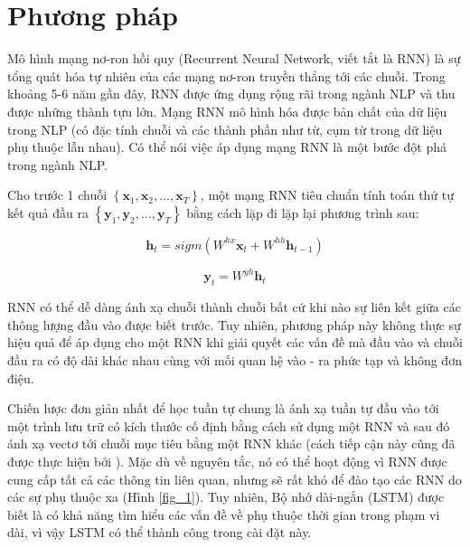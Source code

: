\section{Phương pháp}

Mô hình mạng nơ-ron hồi quy (Recurrent Neural Network, viết tắt là RNN) \citep{werbos1990backpropagation, rumelhart1986learning} là sự tổng quát hóa tự nhiên của các mạng nơ-ron truyền thẳng tới các chuỗi. Trong khoảng 5-6 năm gần đây, RNN được ứng dụng rộng rãi trong ngành NLP và thu được những thành tựu lớn. Mạng RNN mô hình hóa được bản chất của dữ liệu trong NLP (có đặc tính chuỗi và các thành phần như từ, cụm từ trong dữ liệu phụ thuộc lẫn nhau). Có thể nói việc áp dụng mạng RNN là một bước đột phá trong ngành NLP.

Cho trước 1 chuỗi $\left\{\mathbf{x}_{1}, \mathbf{x}_{2}, \ldots, \mathbf{x}_{T}\right\}$, một mạng RNN tiêu chuẩn tính toán thứ tự kết quả đầu ra $\left\{\mathbf{y}_{1}, \mathbf{y}_{2}, \ldots, \mathbf{y}_{T}\right\}$ bằng cách lặp đi lặp lại phương trình sau:

\begin{equation}
\mathbf{h}_{t}=sigm\left(W^{hx}{\mathbf{x}_{t}} + W^{hh}{\mathbf{h}_{t-1}}\right)
\end{equation}

\begin{equation}
\mathbf{y}_{t}=W^{yh}{\mathbf{h}_{t}}
\end{equation}

RNN có thể dễ dàng ánh xạ chuỗi thành chuỗi bất cứ khi nào sự liên kết giữa các thông lượng đầu vào được biết trước. Tuy nhiên, phương pháp này không thực sự hiệu quả để áp dụng cho một RNN khi giải quyết các vấn đề mà đầu vào và chuỗi đầu ra có độ dài khác nhau cùng với mối quan hệ vào - ra phức tạp và không đơn điệu.

Chiến lược đơn giản nhất để học tuần tự chung là ánh xạ tuần tự đầu vào tới một trình lưu trữ có kích thước cố định bằng cách sử dụng một RNN và sau đó ánh xạ vectơ tới chuỗi mục tiêu bằng một RNN khác (cách tiếp cận này cũng đã được thực hiện bởi \citep{cho2014learning}). Mặc dù về nguyên tắc, nó có thể hoạt động vì RNN được cung cấp tất cả các thông tin liên quan, nhưng sẽ rất khó để đào tạo các RNN do các sự phụ thuộc xa (Hình \ref{fig_1}). Tuy nhiên, Bộ nhớ dài-ngắn (LSTM) \citep{HochreiterandSchmidhuber1997} được biết là có khả năng tìm hiểu các vấn đề về phụ thuộc thời gian trong phạm vi dài, vì vậy LSTM có thể thành công trong cài đặt này.

